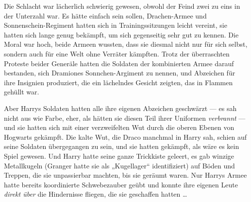 Die Schlacht war lächerlich schwierig gewesen, obwohl der Feind zwei zu eins in der Unterzahl war. Es hätte einfach sein sollen, Drachen-Armee und Sonnenschein-Regiment hatten sich in Trainingssitzungen leicht vereint, sie hatten sich lange genug bekämpft, um sich gegenseitig sehr gut zu kennen. Die Moral war hoch, beide Armeen wussten, dass sie diesmal nicht nur für sich selbst, sondern auch für eine Welt ohne Verräter kämpften. Trotz der überraschten Proteste beider Generäle hatten die Soldaten der kombinierten Armee darauf bestanden, sich Dramiones Sonnchen-Argiment zu nennen, und Abzeichen für ihre Insignien produziert, die ein lächelndes Gesicht zeigten, das in Flammen gehüllt war.

Aber Harrys Soldaten hatten alle ihre eigenen Abzeichen geschwärzt — es sah nicht aus wie Farbe, eher, als hätten sie diesen Teil ihrer Uniformen \emph{verbrannt} — und sie hatten sich mit einer verzweifelten Wut durch die oberen Ebenen von Hogwarts gekämpft. Die kalte Wut, die Draco manchmal in Harry sah, schien auf seine Soldaten übergegangen zu sein, und sie hatten gekämpft, als wäre es kein Spiel gewesen. Und Harry hatte seine ganze Trickkiste geleert, es gab winzige Metallkugeln (Granger hatte sie als „Kugellager“ identifiziert) auf Böden und Treppen, die sie unpassierbar machten, bis sie geräumt waren. Nur Harrys Armee hatte bereits koordinierte Schwebezauber geübt und konnte ihre eigenen Leute \emph{direkt über} die Hindernisse fliegen, die sie geschaffen hatten …

